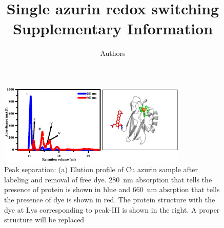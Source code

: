 \documentclass[11pt,a4paper,onecolumn]{article}
\newcommand*{\affaddr}[1]{#1} %
\newcommand*{\email}[1]{\texttt{#1}} %
\begin{document}
\author{Authors
}

\date{\vspace{1ex}} %

\title{\textbf{Single azurin redox switching}\\ \vspace{3ex} Supplementary Information{} \vspace{3ex}}

\maketitle
\tableofcontents
\pagebreak
\begin{figure}
  \centering
  \includegraphics[width=0.8\textwidth]{peak_separation.eps}
  \makeatletter
  \renewcommand{\fnum@figure}{\figurename~S\thefigure}
  \makeatother
  \caption{Peak separation: (a) Elution profile of Cu azurin sample after labeling and removal of free dye.
  \SI{280}{\nm} absorption that tells the presence of protein is shown in blue and \SI{660}{\nm} absrption that tells the presence of  dye is shown in red.
  The protein structure with the dye at Lys corresponding to peak-III is shown in the right. 
  {A proper structure will be replaced}}
  \label{SIfig: peak_sep}
\end{figure}
\end{document}
